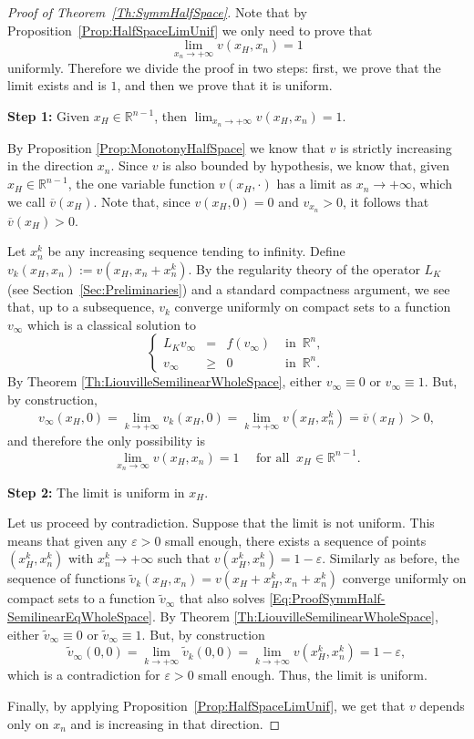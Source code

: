 \documentclass[12pt,reqno]{amsart}
\theoremstyle{definition}
\theoremstyle{remark}
\newcommand{\con}[1]{\mathbb{#1}}
\newcommand{\R}{\con{R}} %
\newcommand\beqc[1]{\left\{\begin{array}{#1}}
\newcommand\eeqc{\end{array} \right.}
\def\PDEsystem{rcll}
\def\ds{\displaystyle}
\numberwithin{equation}{section}
\begin{document}
\begin{proof}[Proof of Theorem~\ref{Th:SymmHalfSpace}]
	Note that by Proposition~\ref{Prop:HalfSpaceLimUnif} we only need to prove that
	$$
	\ds \lim_{x_n\to+ \infty} v(x_H,x_n) = 1
	$$
	uniformly. Therefore we divide the proof in two steps: first, we prove that the limit exists and is $1$, and then we prove that it is uniform.
	
	
	\textbf{Step 1:} Given $x_H\in \R^{n-1}$, then  $\ds \lim_{x_n\to +\infty} v(x_H,x_n) = 1$.
	
	By Proposition \ref{Prop:MonotonyHalfSpace} we know that $v$ is strictly increasing in the direction $x_n$. Since $v$ is also bounded by hypothesis, we know that, given $x_H\in\R^{n-1}$, the one variable function $v(x_H,\cdot)$ has a limit as $x_n\to +\infty$, which we call $\overline{v}(x_H)$. Note that, since $v(x_H,0) = 0$ and $v_{x_n}>0$, it follows that $\overline{v}(x_H) > 0$.
	
	Let $x_n^k$ be any increasing sequence tending to infinity. Define $v_k(x_H,x_n) := v(x_H,x_n+x_n^k)$. By the regularity theory of the operator $L_K $ (see Section~\ref{Sec:Preliminaries}) and a standard compactness argument, we see that, up to a subsequence, $v_k$ converge uniformly on compact sets to a function $v_\infty$ which is a classical solution to
	\begin{equation}
	\label{Eq:ProofSymmHalf-SemilinearEqWholeSpace}
	\beqc{\PDEsystem}
	L_K v_\infty &=& f(v_\infty)   &\textrm{ in } \,\R^n,\\
	v_\infty &\geq& 0   &\textrm{ in } \,\R^n.
	\eeqc
	\end{equation}
	By Theorem \ref{Th:LiouvilleSemilinearWholeSpace}, either $v_\infty\equiv 0$ or $v_\infty \equiv 1$. But, by construction,
	$$ v_\infty(x_H,0) = \lim_{k\to + \infty} v_k(x_H,0) = \lim_{k\to + \infty} v(x_H,x_n^k) = \overline{v}(x_H) > 0, $$
	and therefore the only possibility is
	$$ \lim_{x_n\to \infty} v(x_H,x_n) = 1 \quad \text{ for all } \ x_H\in\R^{n-1}. $$
	
	\textbf{Step 2:} The limit is uniform in $x_H$.
	
	Let us proceed by contradiction. Suppose that the limit is not uniform. This means that given any $\varepsilon>0$ small enough, there exists a sequence of points $(x_H^k,x_n^k)$ with $x_n^k\to +\infty$ such that $v(x_H^k,x_n^k) = 1-\varepsilon$. Similarly as before, the sequence of functions $\tilde{v}_k(x_H,x_n) = v(x_H+x_H^k,x_n+x_n^k)$ converge uniformly on compact sets to a function $\tilde{v}_\infty$ that also solves \eqref{Eq:ProofSymmHalf-SemilinearEqWholeSpace}. By Theorem \ref{Th:LiouvilleSemilinearWholeSpace}, either $\tilde{v}_\infty\equiv 0$ or $\tilde{v}_\infty \equiv 1$. But, by construction
	$$ 
	\tilde{v}_\infty(0,0) = \lim_{k\to +\infty} \tilde{v}_k(0,0) = \lim_{k\to +\infty} v(x_H^k,x_n^k) = 1-\varepsilon, 
	$$
	which is a contradiction for $\varepsilon>0$ small enough. Thus, the limit is uniform.
	
	Finally, by applying Proposition~\ref{Prop:HalfSpaceLimUnif}, we get that $v$ depends only on $x_n$ and is increasing in that direction.
\end{proof}
\end{document}
